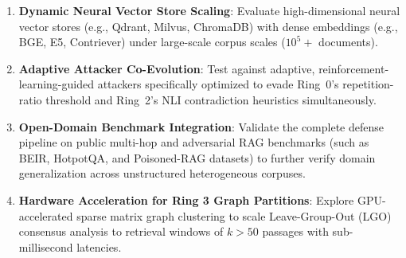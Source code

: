 \begin{enumerate}
\item \textbf{Dynamic Neural Vector Store Scaling}:
  Evaluate high-dimensional neural vector stores (e.g., Qdrant, Milvus, ChromaDB)
  with dense embeddings (e.g., BGE, E5, Contriever) under large-scale corpus
  scales ($10^5+$ documents).
\item \textbf{Adaptive Attacker Co-Evolution}:
  Test against adaptive, reinforcement-learning-guided attackers specifically
  optimized to evade Ring~0's repetition-ratio threshold and Ring~2's NLI
  contradiction heuristics simultaneously.
\item \textbf{Open-Domain Benchmark Integration}:
  Validate the complete defense pipeline on public multi-hop and adversarial RAG
  benchmarks (such as BEIR, HotpotQA, and Poisoned-RAG datasets) to further verify
  domain generalization across unstructured heterogeneous corpuses.
\item \textbf{Hardware Acceleration for Ring 3 Graph Partitions}:
  Explore GPU-accelerated sparse matrix graph clustering to scale Leave-Group-Out
  (LGO) consensus analysis to retrieval windows of $k > 50$ passages with sub-millisecond
  latencies.
\end{enumerate}
